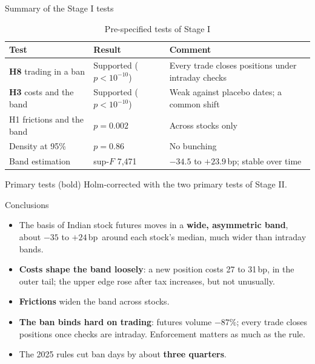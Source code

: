 \documentclass[11pt]{beamer}
\newcommand{\bp}{\,bp}
\begin{document}
\begin{frame}{Summary of the Stage I tests}
  \begin{table}
    \scriptsize
    \caption{Pre-specified tests of Stage I}
    \begin{tabular}{@{}p{3.0cm}p{2.9cm}p{4.3cm}@{}}
      \toprule
      Test & Result & Comment \\
      \midrule
      \textbf{H8} trading in a ban & Supported ($p<10^{-10}$) & Every trade closes positions under intraday checks \\
      \textbf{H3} costs and the band & Supported ($p<10^{-10}$) & Weak against placebo dates; a common shift \\
      H1 frictions and the band & $p=0.002$ & Across stocks only \\
      Density at 95\% & $p=0.86$ & No bunching \\
      Band estimation & sup-$F$ 7,471 & $-34.5$ to $+23.9$\bp; stable over time \\
      \bottomrule
    \end{tabular}
  \end{table}
  \footnotesize Primary tests (bold) Holm-corrected with the two primary tests of Stage II.
\end{frame}

\begin{frame}{Conclusions}
  \begin{itemize}
    \item The basis of Indian stock futures moves in a \textbf{wide, asymmetric band}, about $-35$ to $+24$\bp\
    around each stock's median, much wider than intraday bands.
    \item \textbf{Costs shape the band loosely}: a new position costs 27 to 31\bp, in the outer tail; the upper edge
    rose after tax increases, but not unusually.
    \item \textbf{Frictions} widen the band across stocks.
    \item \textbf{The ban binds hard on trading}: futures volume $-87\%$; every trade closes positions once checks are
    intraday. Enforcement matters as much as the rule.
    \item The 2025 rules cut ban days by about \textbf{three quarters}.
  \end{itemize}
\end{frame}
\end{document}
